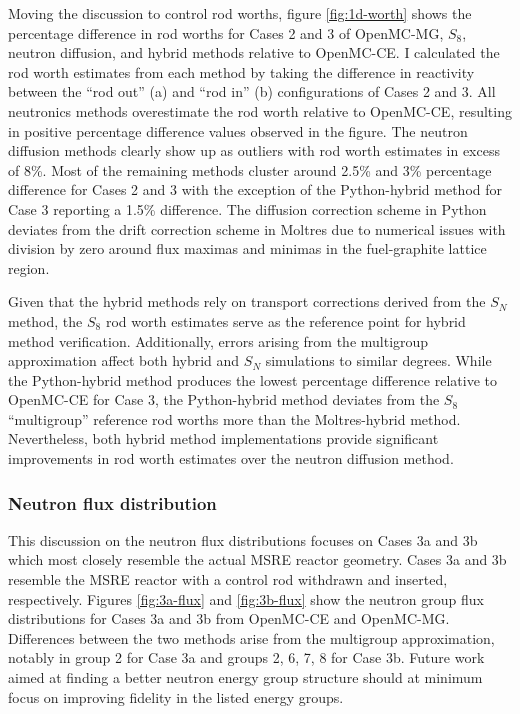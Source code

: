 Moving the discussion to control rod worths, figure \ref{fig:1d-worth} shows the percentage
difference in rod worths for Cases 2 and 3 of OpenMC-MG, $S_8$, neutron diffusion, and hybrid
methods relative to OpenMC-CE. I calculated the rod worth estimates from each method by taking the
difference in reactivity between the ``rod out'' (a) and ``rod in'' (b) configurations of Cases 2
and 3. All neutronics methods overestimate the rod worth relative to OpenMC-CE, resulting in
positive percentage difference values observed in the figure.
The neutron diffusion methods clearly show up as outliers with rod worth estimates in excess
of 8\%. Most of the remaining methods cluster around 2.5\% and 3\% percentage difference for Cases
2 and 3 with the exception of the Python-hybrid method for Case 3 reporting a 1.5\% difference.
The diffusion correction scheme in Python deviates from the drift correction
scheme in Moltres due to numerical issues with division by zero around flux maximas and minimas
in the fuel-graphite lattice region.

Given that the hybrid methods rely on transport corrections derived from the $S_N$ method, the
$S_8$ rod worth estimates serve as the
reference point for hybrid method verification. Additionally, errors arising from the multigroup
approximation affect both hybrid and $S_N$ simulations to similar degrees. While the Python-hybrid
method produces the lowest percentage difference relative to OpenMC-CE for Case 3, the
Python-hybrid method deviates from the $S_8$ ``multigroup'' reference rod worths more than the
Moltres-hybrid method. Nevertheless, both hybrid method implementations provide significant
improvements in rod worth estimates over the neutron diffusion method.

\subsubsection{Neutron flux distribution}

This discussion on the neutron flux distributions focuses on Cases 3a and 3b which most closely
resemble the actual \gls{MSRE} reactor geometry. Cases 3a and 3b resemble the \gls{MSRE} reactor
with a control rod withdrawn and inserted, respectively. Figures \ref{fig:3a-flux} and
\ref{fig:3b-flux} show the neutron group flux distributions for Cases 3a and 3b from OpenMC-CE and
OpenMC-MG. Differences between the two methods arise from the multigroup approximation, notably in
group 2 for Case 3a and groups 2, 6, 7, 8 for Case 3b. Future work aimed at finding a better
neutron energy group structure should at minimum focus on improving fidelity in the listed energy
groups.


